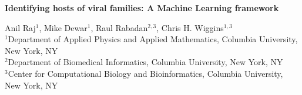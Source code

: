 \documentclass[11pt,amsmath,amssymb,amstex]{article}
\begin{document}
\begin{center}
\pagestyle{empty}
\textbf{Identifying hosts of viral families: A Machine Learning framework}

\small{
Anil Raj$^{1}$, Mike Dewar$^{1}$, Raul Rabadan$^{2,3}$, Chris H. Wiggins$^{1,3}$\\
$^{1}$Department of Applied Physics and Applied Mathematics, Columbia University, New York, NY\\
$^{2}$Department of Biomedical Informatics, Columbia University, New York, NY\\
$^{3}$Center for Computational Biology and Bioinformatics, Columbia University, New York, NY\\
}
\end{center}





\end{document}
